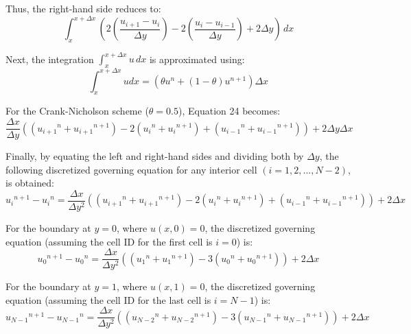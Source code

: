 \documentclass[letterpaper,12pt]{article}
\begin{document}
Thus, the right-hand side reduces to:
\begin{equation}
\int_{x}^{x + \Delta x} \left(2\left( \frac{u_{i+1} - u_{i}}{\Delta y}\right) - 2 \left(\frac{u_{i} - u_{i-1}}{\Delta y}\right) + 2 \Delta y\right)\, dx
\end{equation}

Next, the integration $\int_x^{x + \Delta x} u\, dx$ is approximated using:
\begin{equation}
\int_x^{x + \Delta x} u dx = \left(\theta u^n + (1 - \theta) u^{n+1}\right) \Delta x
\end{equation}

For the Crank-Nicholson scheme ($\theta = 0.5$), Equation 24 becomes:
\begin{equation}
\frac{\Delta x}{\Delta y} \left( \left({u_{i+1}}^{n} + {u_{i+1}}^{n+1}\right) - 2\left({u_{i}}^{n} + {u_{i}}^{n+1}\right) + \left({u_{i-1}}^{n} + {u_{i-1}}^{n+1}\right)\right) + 2 \Delta y \Delta x
\end{equation}

Finally, by equating the left and right-hand sides and dividing both by $\Delta y$, the following discretized governing equation for any interior cell $(i = 1,2,...,N-2)$, is obtained:
\begin{equation}
\boxed{ 
{u_{i}}^{n+1} - {u_{i}}^{n} = \frac{\Delta x}{\Delta y^2} \left( \left({u_{i+1}}^{n} + {u_{i+1}}^{n+1}\right) - 2\left({u_{i}}^{n} + {u_{i}}^{n+1}\right) + \left({u_{i-1}}^{n} + {u_{i-1}}^{n+1}\right)\right) + 2 \Delta x
}
\end{equation}

For the boundary at $y = 0$, where $u(x,0) = 0$, the discretized governing equation (assuming the cell ID for the first cell is $i=0$) is:
\begin{equation}
\boxed{
{u_{0}}^{n+1} - {u_{0}}^{n} = \frac{\Delta x}{\Delta y^2} \left( \left({u_{1}}^{n} + {u_{1}}^{n+1}\right) - 3 \left({u_{0}}^{n} + {u_{0}}^{n+1}\right) \right) + 2 \Delta x
}
\end{equation}

For the boundary at $y = 1$, where $u(x,1) = 0$, the discretized governing equation (assuming the cell ID for the last cell is $i=N-1$) is:
\begin{equation}
\boxed{
{u_{N-1}}^{n+1} - {u_{N-1}}^{n} = \frac{\Delta x}{\Delta y^2} \left( \left({u_{N-2}}^{n} + {u_{N-2}}^{n+1}\right) - 3 \left({u_{N-1}}^{n} + {u_{N-1}}^{n+1}\right) \right) + 2 \Delta x
}
\end{equation}
\end{document}
